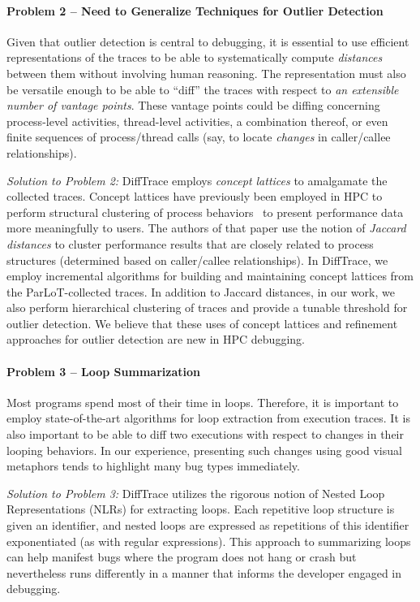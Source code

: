\paragraph{Problem 2 -- Need to Generalize Techniques for Outlier Detection\/}
Given that outlier detection is central to debugging,
it is essential to use efficient representations of the traces
to be able to systematically compute
{\em distances} between them without
involving human reasoning.
%
The representation must also be versatile enough to
be able to ``diff'' the traces
with respect to {\em an extensible number of vantage points}.
%
These vantage points could be diffing concerning process-level activities,
thread-level activities, a combination thereof,
or even finite sequences of process/thread calls (say, to locate {\em changes}
in caller/callee relationships).


{\em Solution to Problem 2:\/}
DiffTrace employs {\em concept lattices} to amalgamate the collected traces.
%
Concept lattices have previously been employed in HPC to perform structural
clustering of process behaviors~\cite{weberStructural} to present performance data more
meaningfully to users.
%
The authors of that paper use the notion of {\em Jaccard distances}
to cluster performance results that are closely related to process structures
(determined based on caller/callee relationships).
%
In DiffTrace, we employ incremental algorithms for building and maintaining
concept lattices from the ParLoT-collected traces.
%
In addition to Jaccard distances, in our work, we also perform hierarchical
clustering of traces and provide a tunable threshold for outlier detection.
%
We believe that these uses of concept lattices and refinement approaches
for outlier detection are new in HPC debugging.


\paragraph{Problem 3 -- Loop Summarization\/}
Most programs spend most of their time in loops.
%
Therefore, it is important to employ state-of-the-art algorithms for
loop extraction from execution traces.
%
It is also important
to be able to diff two executions with respect to changes in their looping behaviors.
%
In our experience, presenting such changes using good visual metaphors
tends to highlight many bug types immediately.


{\em Solution to Problem 3:\/}
DiffTrace utilizes the rigorous notion of Nested Loop Representations (NLRs) for
extracting loops.
%
Each repetitive loop structure is given an identifier, and nested loops are
expressed as repetitions of this identifier exponentiated (as with regular
expressions).
%
This approach to summarizing loops can help manifest
bugs where the program does not hang or crash but nevertheless
runs differently in a manner that informs the developer engaged in debugging.

